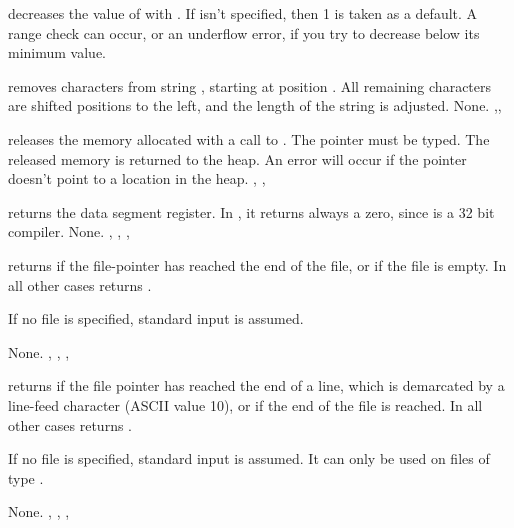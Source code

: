 \documentclass{report}
\begin{document}


{ decreases the value of  with .
If  isn't specified, then 1 is taken as a default.}
{A range check can occur, or an underflow error, if you try to decrease 
below its minimum value.}
{}



{ removes  characters from string , starting
at position . All remaining characters are shifted  
positions to the left, and the length of the string is adjusted.
}
{None.}
{,,}



{ releases the memory allocated with a call to .
The pointer  must be typed. The released memory is returned to the
heap.}
{An error will occur if the pointer doesn't point to a location in the
heap.}
{, , }



{ returns the data segment register. In \fpk, it returns always a
zero, since \fpk is a 32 bit compiler.}
{None.}
{, , , }



{ returns  if the file-pointer has reached the end of the
file, or if the file is empty. In all other cases  returns
.

If no file  is specified, standard input is assumed.}
{None.}
{, , , }



{ returns  if the file pointer has reached the end of a
line, which is demarcated by a line-feed character (ASCII value 10), or if
the end of the file is reached.
In all other cases  returns .

If no file  is specified, standard input is assumed.
It can only be used on files of type .}
{None.}
{, , , }
\end{document}
